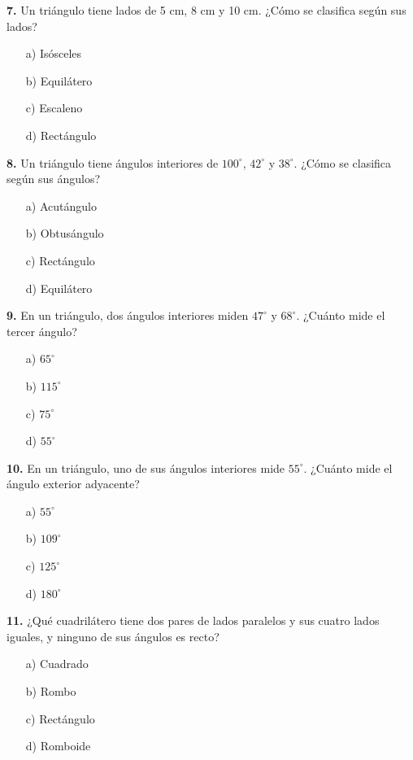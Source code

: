 \noindent\textbf{7.} Un triángulo tiene lados de 5 cm, 8 cm y 10 cm. ¿Cómo se clasifica según sus lados?

\begin{itemize}
    \item[a)] Isósceles
    \item[b)] Equilátero
    \item[c)] Escaleno
    \item[d)] Rectángulo
\end{itemize}


\noindent\textbf{8.} Un triángulo tiene ángulos interiores de $100^\circ$, $42^\circ$ y $38^\circ$. ¿Cómo se clasifica según sus ángulos?

\begin{itemize}
    \item[a)] Acutángulo
    \item[b)] Obtusángulo
    \item[c)] Rectángulo
    \item[d)] Equilátero
\end{itemize}


\noindent\textbf{9.} En un triángulo, dos ángulos interiores miden $47^\circ$ y $68^\circ$. ¿Cuánto mide el tercer ángulo?

\begin{itemize}
    \item[a)] $65^\circ$
    \item[b)] $115^\circ$
    \item[c)] $75^\circ$
    \item[d)] $55^\circ$
\end{itemize}


\noindent\textbf{10.} En un triángulo, uno de sus ángulos interiores mide $55^\circ$. ¿Cuánto mide el ángulo exterior adyacente?

\begin{itemize}
    \item[a)] $55^\circ$
    \item[b)] $109^\circ$
    \item[c)] $125^\circ$
    \item[d)] $180^\circ$
\end{itemize}


\noindent\textbf{11.} ¿Qué cuadrilátero tiene dos pares de lados paralelos y sus cuatro lados iguales, y ninguno de sus ángulos es recto?

\begin{itemize}
    \item[a)] Cuadrado
    \item[b)] Rombo
    \item[c)] Rectángulo
    \item[d)] Romboide
\end{itemize}


